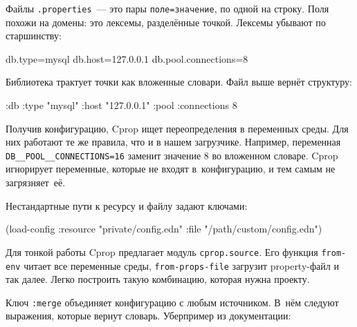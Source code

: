 \else

\begin{english}
\end{english}

\fi

Файлы \verb|.properties|~--- это пары \verb|поле=значение|, по одной на
строку. Поля похожи на домены: это лексемы, разделённые точкой. Лексемы убывают
по старшинству:

\begin{english}
  \begin{ini}
db.type=mysql
db.host=127.0.0.1
db.pool.connections=8
  \end{ini}
\end{english}

Библиотека трактует точки как вложенные словари. Файл выше вернёт структуру:

\begin{english}
  \begin{clojure}
{:db {:type "mysql"
      :host "127.0.0.1"
      :pool {:connections 8}}}
  \end{clojure}
\end{english}

Получив конфигурацию, Cprop ищет переопределения в переменных среды. Для них
работают те же правила, что и в нашем загрузчике. Например, переменная
\verb|DB__POOL__CONNECTIONS=16| заменит значение 8 во вложенном словаре. Cprop
игнорирует переменные, которые не входят в~конфигурацию, и тем самым не
загрязняет~её.

Нестандартные пути к ресурсу и файлу задают ключами:

\begin{english}
  \begin{clojure}
(load-config
 :resource "private/config.edn"
 :file "/path/custom/config.edn")
  \end{clojure}
\end{english}


Для тонкой работы Cprop предлагает модуль \verb|cprop.source|. Его функция
\verb|from-env| читает все переменные среды, \verb|from-props-file| загрузит
property-файл и так далее. Легко построить такую комбинацию, которая нужна
проекту.

Ключ \verb|:merge| объединяет конфигурацию с любым источником. В~нём
следуют выражения, которые вернут словарь. Уберпример из документации:

